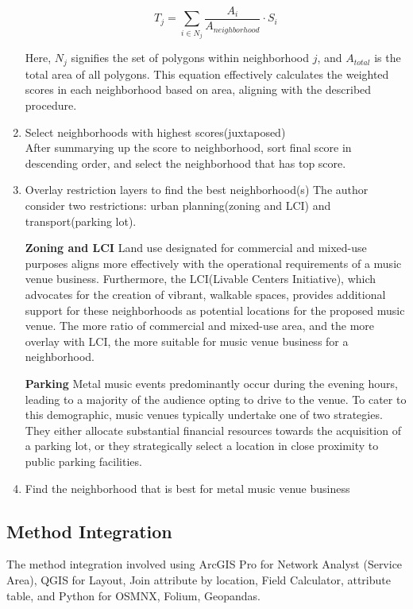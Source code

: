\documentclass[11pt]{article}
\begin{document}
\begin{enumerate}
{\begin{equation}
T_j = \sum_{i \in N_j} \frac{A_i}{A_{neighborhood}} \cdot S_i
\end{equation}

Here, $N_j$ signifies the set of polygons within neighborhood $j$, and $A_{total}$ is the total area of all polygons. This equation effectively calculates the weighted scores in each neighborhood based on area, aligning with the described procedure.
}

\item{Select neighborhoods with highest scores(juxtaposed)\\
After summarying up the score to neighborhood, sort final score in descending order, and select the neighborhood that has top score.
}

\item{Overlay restriction layers to find the best neighborhood(s)
The author consider two restrictions: urban planning(zoning and LCI) and transport(parking lot).  


\textbf{Zoning and LCI}
Land use designated for commercial and mixed-use purposes aligns more effectively with the operational requirements of a music venue business. Furthermore, the LCI(Livable Centers Initiative), which advocates for the creation of vibrant, walkable spaces, provides additional support for these neighborhoods as potential locations for the proposed music venue. The more ratio of commercial and mixed-use area, and the more overlay with LCI, the more suitable for music venue business for a neighborhood.

\textbf{Parking}
Metal music events predominantly occur during the evening hours, leading to a majority of the audience opting to drive to the venue. To cater to this demographic, music venues typically undertake one of two strategies. They either allocate substantial financial resources towards the acquisition of a parking lot, or they strategically select a location in close proximity to public parking facilities. 
}
\item {Find the neighborhood that is best for metal music venue business}
\end{enumerate}




\subsection{Method Integration}
The method integration involved using ArcGIS Pro for Network Analyst (Service Area), QGIS for Layout, Join attribute by location, Field Calculator, attribute table, and Python for OSMNX, Folium, Geopandas.
\end{document}
